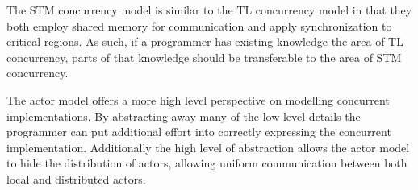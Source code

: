 The \ac{STM} concurrency model is similar to the \ac{TL} concurrency model in that they both employ shared memory for communication and apply synchronization to critical regions. As such, if a programmer has existing knowledge the area of \ac{TL} concurrency, parts of that knowledge should be transferable to the area of \ac{STM} concurrency.

The actor model offers a more high level perspective on modelling concurrent implementations. By abstracting away many of the low level details the programmer can put additional effort into correctly expressing the concurrent implementation. Additionally the high level of abstraction allows the actor model to hide the distribution of actors, allowing uniform communication between both local and distributed actors.





\worksheetend